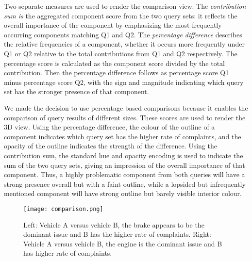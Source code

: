 Two separate measures are used to render the comparison view.
The \emph{contribution sum is} the aggregated component score from the two
query sets: it reflects the overall importance of the component by emphasizing
the most frequently occurring components matching Q1 and
Q2. The \emph{percentage difference} describes the relative frequencies of a
component, whether it occurs more frequently under Q1 or Q2 relative
to the total contributions from Q1 and Q2 respectively. The percentage
score is calculated as the component score divided by the total
contribution. Then the percentage difference follows as percentage
score Q1 minus percentage score Q2, with the sign and magnitude indicating
which query set has the stronger presence of that component.

We made the decision to use percentage based comparisons because it
enables the comparison of query results of different sizes.
These scores are used to render the 3D view. Using the percentage
difference, the colour of the outline of a component indicates which
query set has the higher rate of complaints, and the opacity of the outline
indicates the strength of the difference. Using the contribution
sum, the standard hue and opacity encoding is used to indicate the
sum of the two query sets, giving an impression of the overall importance
of that component. Thus, a highly problematic component from
both queries will have a strong presence overall but with a faint outline,
while a lopsided but infrequently mentioned component will have
strong outline but barely visible interior colour.


	\begin{figure}
	 \centering  
	 \texttt{[image: comparison.png]}
	 \caption[Comparison View]{Left: Vehicle A versus vehicle B, the brake appears
	 to be the dominant issue and B has the higher rate of complaints. Right:
	 Vehicle A versus vehicle B, the engine is the dominant issue and B has higher rate of complaints.}
	 \label{figure:comparison}
	\end{figure}
 

